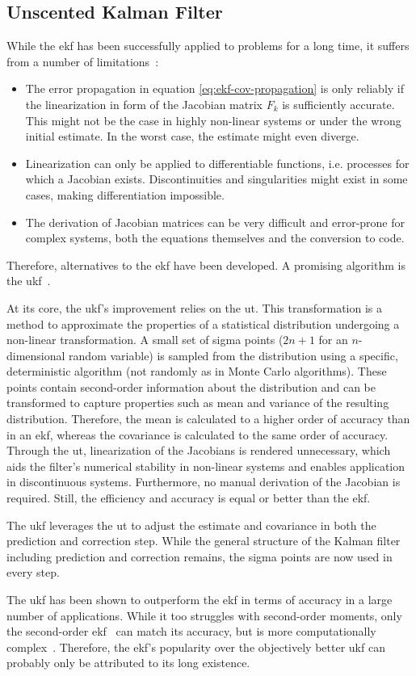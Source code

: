 \subsection{Unscented Kalman Filter}
While the \gls{ekf} has been successfully applied to problems for a long time, it suffers from a number of limitations~\cite[p.~402]{Julier.2004}:
\begin{itemize}
\item The error propagation in equation \ref{eq:ekf-cov-propagation} is only reliably if the linearization in form of the Jacobian matrix $F_k$ is sufficiently accurate. This might not be the case in highly non-linear systems or under the wrong initial estimate. In the worst case, the estimate might even diverge.
\item Linearization can only be applied to differentiable functions, i.e. processes for which a Jacobian exists. Discontinuities and singularities might exist in some cases, making differentiation impossible.
\item The derivation of Jacobian matrices can be very difficult and error-prone for complex systems, both the equations themselves and the conversion to code.
\end{itemize}
Therefore, alternatives to the \gls{ekf} have been developed. A promising algorithm is the \gls{ukf}~\cite{SimonJ.Julier.1997}.

At its core, the \gls{ukf}'s improvement relies on the \gls{ut}. This transformation is a method to approximate the properties of a statistical distribution undergoing a non-linear transformation. A small set of sigma points ($2n+1$ for an $n$-dimensional random variable) is sampled from the distribution using a specific, deterministic algorithm (not randomly as in Monte Carlo algorithms). These points contain second-order information about the distribution and can be transformed to capture properties such as mean and variance of the resulting distribution. Therefore, the mean is calculated to a higher order of accuracy than in an \gls{ekf}, whereas the covariance is calculated to the same order of accuracy. Through the \gls{ut}, linearization of the Jacobians is rendered unnecessary, which aids the filter's numerical stability in non-linear systems and enables application in discontinuous systems. Furthermore, no manual derivation of the Jacobian is required. Still, the efficiency and accuracy is equal or better than the \gls{ekf}.

The \gls{ukf} leverages the \gls{ut} to adjust the estimate and covariance in both the prediction and correction step. While the general structure of the Kalman filter including prediction and correction remains, the sigma points are now used in every step.

The \gls{ukf} has been shown to outperform the \gls{ekf} in terms of accuracy in a large number of applications. While it too struggles with second-order moments, only the second-order \gls{ekf}~\cite{M.Roth.2011} can match its accuracy, but is more computationally complex~\cite{Gustafsson.2012}. Therefore, the \gls{ekf}'s popularity over the objectively better \gls{ukf} can probably only be attributed to its long existence.

